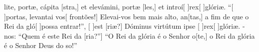 {  {lite, portæ, cápita [stra,] et elevámini, portæ [les,] et introí[ ]{rex}[ ]{gló}riæ.}%
    {``[ ]{por}tas, levantai vos[ frontões!] Elevai-vos bem mais alto, an[tas,] a fim de que o Rei da gló[ ]{pos}{sa} entrar!''},
  {[ ]{est} [riæ?] Dóminus virtútum ipse [ ]{rex}[ ]{gló}riæ.}%
    {-nos: ``Quem é este Rei da [ria?''] ``O Rei da glória é o Senhor o[te,] o Rei da glória é o Senhor Deus do so!''}
}